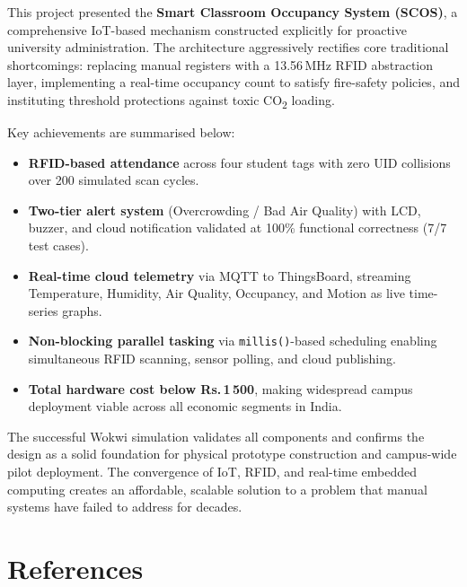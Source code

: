 \documentclass[12pt,a4paper]{article}
\begin{document}
This project presented the \textbf{Smart Classroom Occupancy System (SCOS)}, a
comprehensive IoT-based mechanism constructed explicitly for proactive university
administration. The architecture aggressively rectifies core traditional shortcomings:
replacing manual registers with a 13.56\,MHz RFID abstraction layer, implementing a
real-time occupancy count to satisfy fire-safety policies, and instituting threshold
protections against toxic CO\textsubscript{2} loading.

Key achievements are summarised below:

\begin{itemize}
  \item \textbf{RFID-based attendance} across four student tags with zero UID collisions
        over 200 simulated scan cycles.
  \item \textbf{Two-tier alert system} (Overcrowding / Bad Air Quality) with LCD, buzzer,
        and cloud notification validated at 100\% functional correctness (7/7 test cases).
  \item \textbf{Real-time cloud telemetry} via MQTT to ThingsBoard, streaming Temperature,
        Humidity, Air Quality, Occupancy, and Motion as live time-series graphs.
  \item \textbf{Non-blocking parallel tasking} via \texttt{millis()}-based scheduling enabling
        simultaneous RFID scanning, sensor polling, and cloud publishing.
  \item \textbf{Total hardware cost below Rs.\,1\,500}, making widespread campus
        deployment viable across all economic segments in India.
\end{itemize}

The successful Wokwi simulation validates all components and confirms the design as a
solid foundation for physical prototype construction and campus-wide pilot deployment.
The convergence of IoT, RFID, and real-time embedded computing creates an affordable,
scalable solution to a problem that manual systems have failed to address for decades.

\section*{References}
\end{document}
